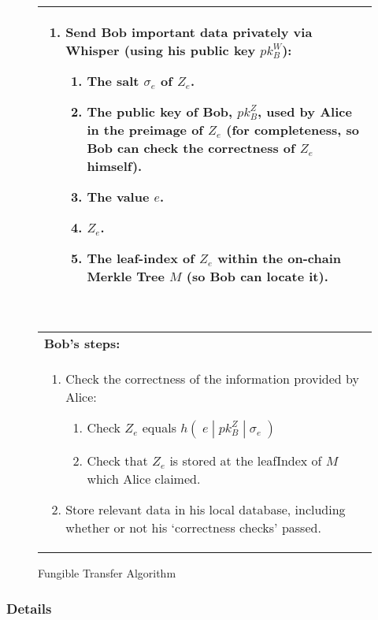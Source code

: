 \begin{figure}[htp]
\begin{center}
\begin{framed}
\begin{tabular}{p{16cm}}
\begin{enumerate}
          \item Send Bob important data privately via Whisper (using his public key $pk^W_B$):
          \begin{enumerate}
            \item The salt $\sigma_e$ of $Z_e$.
            \item The public key of Bob, $pk^Z_B$, used by Alice in the preimage of $Z_e$ (for completeness, so Bob can check the correctness of $Z_e$ himself).
            \item The value $e$.
            \item $Z_e$.
            \item The leaf-index of $Z_e$ within the on-chain Merkle Tree $M$ (so Bob can locate it).
          \end{enumerate}
          \setcounter{ongoingEnumCounter}{\value{enumi}}
        \end{enumerate}
        \ \\
        \midrule
        \textbf{Bob's steps:}\\
        \begin{enumerate}
          \setcounter{enumi}{\value{ongoingEnumCounter}}
          \item Check the correctness of the information provided by Alice:
          \begin{enumerate}
            \item Check $Z_e$ equals $h(\;e\;|\;pk^Z_B\;|\;\sigma_e\;)$
            \item Check that $Z_e$ is stored at the leafIndex of $M$ which Alice claimed.
          \end{enumerate}
          \item Store relevant data in his local database, including whether or not his `correctness checks' passed.
          \setcounter{ongoingEnumCounter}{0} %
        \end{enumerate} 
			\end{tabular}
		\end{framed}
	\end{center}
\caption{Fungible Transfer Algorithm} %
\end{figure}



\newpage
\subsubsection{Details}
\label{sec:721TransferDetails}

